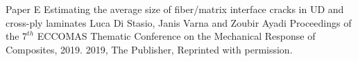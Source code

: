 \documentclass[12pt,a4paper,openright,final,twoside]{msethesisul}
\begin{document}
\newrefsection
\makepapersubmitted
  {\paperheader}
  {\papertitle}
  {\paperauthorstring}
  {}
  {\copyrightstring}



\def\paperheader{Paper E}
\def\papertitle{Estimating the average size of fiber/matrix interface cracks in UD and cross-ply laminates}
\def\paperauthorstring{Luca Di Stasio, Janis Varna and Zoubir Ayadi}
\def\referencestring{Proceedings of the $7^{th}$ ECCOMAS Thematic Conference on the Mechanical Response of Composites, 2019.}
\def\copyrightstring{2019, The Publisher, Reprinted with permission.}

\newrefsection
\makepaper
  {\paperheader}
  {\papertitle}
  {\paperauthorstring}
  {\referencestring}
  {\copyrightstring}



\end{document}
